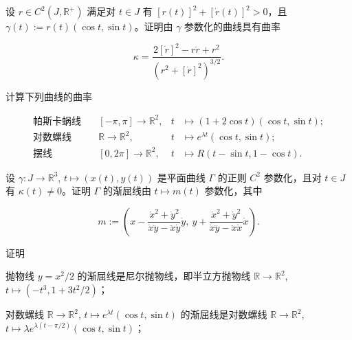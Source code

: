 \begin{exercises}
\item

设 $ r \in C^{2}(J, \mathbb{R}^{+}) $ 满足对 $ t \in J $ 有 $ [r(t)]^{2} + [\dot r(t)]^{2} > 0 $，且 $ \gamma(t) := r(t)(\cos t, \sin t) $。证明由 $ \gamma $ 参数化的曲线具有曲率

\[
\kappa = \frac{2[\dot r]^{2} - r\ddot r + r^{2}}{(r^{2} + [\dot r]^{2})^{3/2}} .
\]
\item

计算下列曲线的曲率

\begin{equation*}
\begin{aligned}
\text{帕斯卡蜗线}\quad &[-\pi,\pi] \to \mathbb{R}^{2} , & t &\mapsto (1+2\cos t)(\cos t,\sin t) ; \\ \text{对数螺线}\quad &\mathbb{R} \to \mathbb{R}^{2} , & t &\mapsto e^{\lambda t}(\cos t,\sin t) ; \\ \text{摆线}\quad &[0,2\pi] \to \mathbb{R}^{2} , & t &\mapsto R(t-\sin t,1-\cos t) .
\end{aligned}
\end{equation*}
\item

设 $ \gamma : J \to \mathbb{R}^{3} $, $ t \mapsto (x(t), y(t)) $ 是平面曲线 $ \Gamma $ 的正则 $ C^{2} $ 参数化，且对 $ t \in J $ 有 $ \kappa(t) \ne 0 $。证明 $ \Gamma $ 的渐屈线由 $ t \mapsto m(t) $ 参数化，其中

\[
m := \left( x - \frac{\dot x^{2} + \dot y^{2}}{\dot x\ddot y - \ddot x\dot y}\dot y ,\ y + \frac{\dot x^{2} + \dot y^{2}}{\dot x\ddot y - \ddot x\dot x}\dot x \right) .
\]
\item

证明

\begin{items}
\item

抛物线 $ y = x^{2}/2 $ 的渐屈线是尼尔抛物线，即半立方抛物线 $ \mathbb{R} \to \mathbb{R}^{2} $, $ t \mapsto (-t^{3}, 1 + 3t^{2}/2) $；

\item

对数螺线 $ \mathbb{R} \to \mathbb{R}^{2} $, $ t \mapsto e^{\lambda t}(\cos t, \sin t) $ 的渐屈线是对数螺线 $ \mathbb{R} \to \mathbb{R}^{2} $, $ t \mapsto \lambda e^{\lambda(t-\pi/2)}(\cos t, \sin t) $；


\item


\end{items}
\end{exercises}

